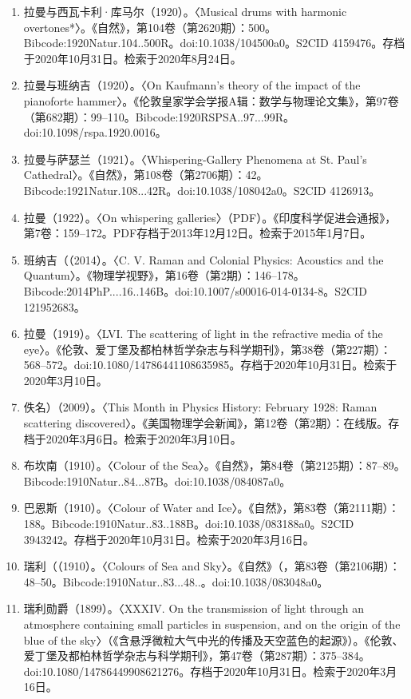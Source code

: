 \begin{enumerate}
\item 拉曼与西瓦卡利·库马尔（1920）。〈Musical drums with harmonic overtones*〉。《自然》，第104卷（第2620期）：500。Bibcode:1920Natur.104..500R。doi:10.1038/104500a0。S2CID 4159476。存档于2020年10月31日。检索于2020年8月24日。
\item 拉曼与班纳吉（1920）。〈On Kaufmann's theory of the impact of the pianoforte hammer〉。《伦敦皇家学会学报A辑：数学与物理论文集》，第97卷（第682期）：99–110。Bibcode:1920RSPSA..97...99R。doi:10.1098/rspa.1920.0016。
\item 拉曼与萨瑟兰（1921）。〈Whispering-Gallery Phenomena at St. Paul's Cathedral〉。《自然》，第108卷（第2706期）：42。Bibcode:1921Natur.108...42R。doi:10.1038/108042a0。S2CID 4126913。
\item 拉曼（1922）。〈On whispering galleries〉（PDF）。《印度科学促进会通报》，第7卷：159–172。PDF存档于2013年12月12日。检索于2015年1月7日。
\item 班纳吉（（2014）。〈C. V. Raman and Colonial Physics: Acoustics and the Quantum〉。《物理学视野》，第16卷（第2期）：146–178。Bibcode:2014PhP....16..146B。doi:10.1007/s00016-014-0134-8。S2CID 121952683。
\item 拉曼（1919）。〈LVI. The scattering of light in the refractive media of the eye〉。《伦敦、爱丁堡及都柏林哲学杂志与科学期刊》，第38卷（第227期）：568–572。doi:10.1080/14786441108635985。存档于2020年10月31日。检索于2020年3月10日。
\item 佚名）（2009）。〈This Month in Physics History: February 1928: Raman scattering discovered〉。《美国物理学会新闻》，第12卷（第2期）：在线版。存档于2020年3月6日。检索于2020年3月10日。
\item 布坎南（1910）。〈Colour of the Sea〉。《自然》，第84卷（第2125期）：87–89。Bibcode:1910Natur..84...87B。doi:10.1038/084087a0。
\item 巴恩斯（1910）。〈Colour of Water and Ice〉。《自然》，第83卷（第2111期）：188。Bibcode:1910Natur..83..188B。doi:10.1038/083188a0。S2CID 3943242。存档于2020年10月31日。检索于2020年3月16日。
\item 瑞利（（1910）。〈Colours of Sea and Sky〉。《自然》（，第83卷（第2106期）：48–50。Bibcode:1910Natur..83...48..。doi:10.1038/083048a0。
\item 瑞利勋爵（1899）。〈XXXIV. On the transmission of light through an atmosphere containing small particles in suspension, and on the origin of the blue of the sky〉（《含悬浮微粒大气中光的传播及天空蓝色的起源》）。《伦敦、爱丁堡及都柏林哲学杂志与科学期刊》，第47卷（第287期）：375–384。doi:10.1080/14786449908621276。存档于2020年10月31日。检索于2020年3月16日。

\end{enumerate}
